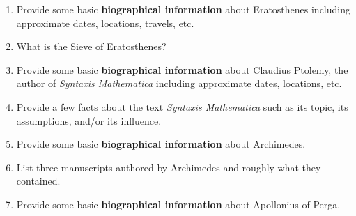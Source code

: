 \documentclass[12pt]{article}
\begin{document}
\begin{enumerate}
\item Provide some basic \textbf{biographical information} about Eratosthenes including approximate dates, locations, travels, etc.
\vfill
\item What is the Sieve of Eratosthenes?
\vfill
\item Provide some basic \textbf{biographical information} about Claudius Ptolemy, the author of \textit{Syntaxis Mathematica} including approximate dates, locations, etc.
\vfill
\item Provide a few facts about the text \textit{Syntaxis Mathematica} such as its topic, its assumptions, and/or its influence.
\vfill
\item Provide some basic \textbf{biographical information} about Archimedes.
\vfill
\item List three manuscripts authored by Archimedes and roughly what they contained.
\vfill
\item Provide some basic \textbf{biographical information} about Apollonius of Perga.
\vfill
\end{enumerate}
\end{document}
